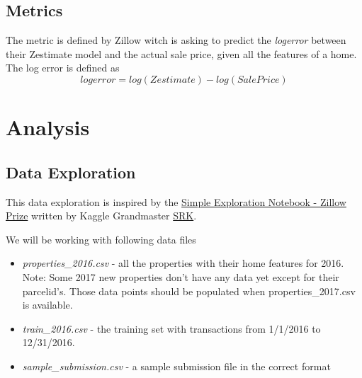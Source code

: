 \documentclass[a4paper]{article}
\begin{document}
\subsection{Metrics}
%
%
The metric is defined by Zillow witch is asking to predict the \textit{logerror} between their Zestimate model and the
actual sale price, given all the features of a home. The log error is defined as
\[ logerror = log(Zestimate) - log(SalePrice) \]


\section{Analysis}

\subsection{Data Exploration}
This data exploration is inspired by the
\href{https://www.kaggle.com/sudalairajkumar/simple-exploration-notebook-zillow-prize}{Simple Exploration Notebook - Zillow Prize}
written by Kaggle Grandmaster \href{https://www.kaggle.com/sudalairajkumar}{SRK}.

We will be working with following data files
\begin{itemize}
    \item \textit{properties\_2016.csv} - all the properties with their home features for 2016. Note: Some 2017 new 
    properties don't have any data yet except for their parcelid's. Those data points should be populated when
    properties\_2017.csv is available.
    \item \textit{train\_2016.csv} - the training set with transactions from 1/1/2016 to 12/31/2016.
    \item \textit{sample\_submission.csv} - a sample submission file in the correct format
\end{itemize}
\end{document}
